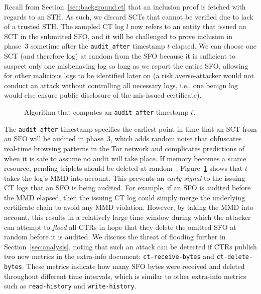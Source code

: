 Recall from Section~\ref{sec:background:ct} that an inclusion proof is fetched
with regards to an STH\@.  As such, we discard SCTs that cannot be verified due
to lack of a trusted STH\@.  The sampled CT log $l$ now refers to an entity that
issued an SCT in the submitted SFO, and it will be challenged to prove inclusion
in phase~3 sometime after the \texttt{audit\_after} timestamp $t$ elapsed. We
can choose one SCT (and therefore log) at random from the SFO because it is
sufficient to suspect only one misbehaving log so long as we report the entire
SFO, allowing for other malicious logs to be identified later on (a risk
averse-attacker would not conduct an attack without controlling all necessary
logs, i.e., one benign log would else ensure public disclosure of the mis-issued
certificate).

\begin{figure}
	\centering
	\caption{%
		Algorithm that computes an \texttt{audit\_after} timestamp $t$.
	}
	\label{fig:audit-after}
\end{figure}

The \texttt{audit\_after} timestamp specifies the earliest point in time that an
SCT from an SFO will be audited in phase~3, which adds random noise that
obfuscates real-time browsing patterns in the Tor network and complicates
predictions of when it is safe to assume no audit will take place. If memory
becomes a scarce resource, pending triplets should be deleted at
random~\cite{nordberg}. Figure~\ref{fig:audit-after} shows that $t$ takes the
log's MMD into account. This prevents an \emph{early signal} to the issuing CT
logs that an SFO is being audited.  For example, if an SFO is audited before the
MMD elapsed, then the issuing CT log could simply merge the underlying
certificate chain to avoid any MMD violation. However, by taking the MMD into
account, this results in a relatively large time window during which the
attacker can attempt to \emph{flood} all CTRs in hope that they delete the
omitted SFO at random before it is audited. We discuss the threat of flooding
further in Section~\ref{sec:analysis}, noting that such an attack can
be detected if CTRs publish two new metrics in the extra-info document:
\texttt{ct-receive-bytes} and \texttt{ct-delete-bytes}. These metrics indicate
how many SFO bytes were received and deleted throughout different time
intervals, which is similar to other extra-info metrics such as
\texttt{read-history} and \texttt{write-history}.

